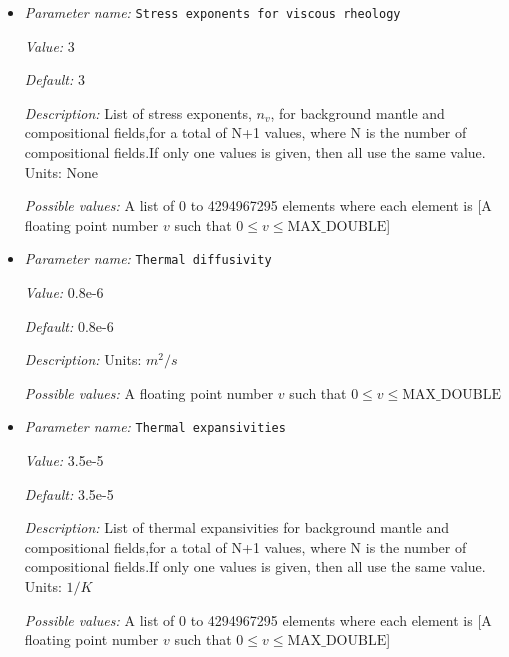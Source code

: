 \begin{itemize}
{\it Value:} 30


{\it Default:} 30


{\it Description:} List of stress exponents, $n_p$, for background mantle and compositional fields,for a total of N+1 values, where N is the number of compositional fields.If only one values is given, then all use the same value.  Units: None


{\it Possible values:} A list of 0 to 4294967295 elements where each element is [A floating point number $v$ such that $0 \leq v \leq \text{MAX\_DOUBLE}$]
\item {\it Parameter name:} {\tt Stress exponents for viscous rheology}
\label{parameters:Material model/Morency and Doin/Stress exponents for viscous rheology}


{\it Value:} 3


{\it Default:} 3


{\it Description:} List of stress exponents, $n_v$, for background mantle and compositional fields,for a total of N+1 values, where N is the number of compositional fields.If only one values is given, then all use the same value.  Units: None


{\it Possible values:} A list of 0 to 4294967295 elements where each element is [A floating point number $v$ such that $0 \leq v \leq \text{MAX\_DOUBLE}$]
\item {\it Parameter name:} {\tt Thermal diffusivity}
\label{parameters:Material model/Morency and Doin/Thermal diffusivity}


{\it Value:} 0.8e-6


{\it Default:} 0.8e-6


{\it Description:} Units: $m^2/s$


{\it Possible values:} A floating point number $v$ such that $0 \leq v \leq \text{MAX\_DOUBLE}$
\item {\it Parameter name:} {\tt Thermal expansivities}
\label{parameters:Material model/Morency and Doin/Thermal expansivities}


{\it Value:} 3.5e-5


{\it Default:} 3.5e-5


{\it Description:} List of thermal expansivities for background mantle and compositional fields,for a total of N+1 values, where N is the number of compositional fields.If only one values is given, then all use the same value.  Units: $1 / K$


{\it Possible values:} A list of 0 to 4294967295 elements where each element is [A floating point number $v$ such that $0 \leq v \leq \text{MAX\_DOUBLE}$]
\end{itemize}

